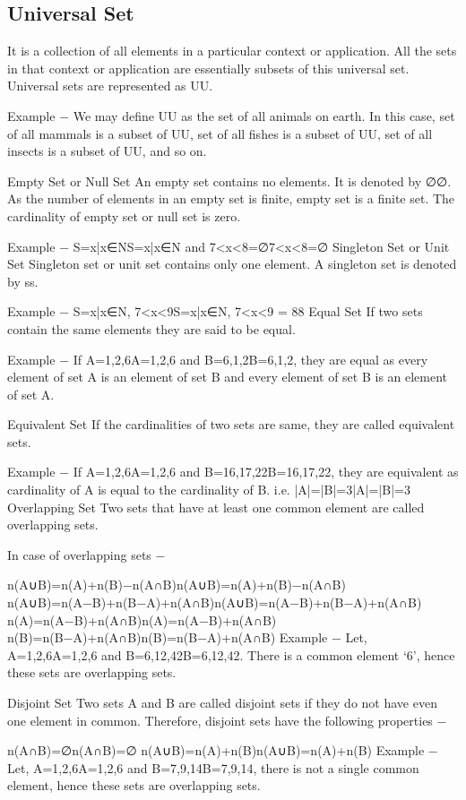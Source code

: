 \documentclass[12pt]{article}
\begin{document}
{\subsection{Universal Set}
It is a collection of all elements in a particular context or application. All the sets in that context or application are essentially subsets of this universal set. Universal sets are represented as UU.

Example − We may define UU as the set of all animals on earth. In this case, set of all mammals is a subset of UU, set of all fishes is a subset of UU, set of all insects is a subset of UU, and so on.

Empty Set or Null Set
An empty set contains no elements. It is denoted by ∅∅. As the number of elements in an empty set is finite, empty set is a finite set. The cardinality of empty set or null set is zero.

Example − S={x|x∈NS={x|x∈N and 7<x<8}=∅7<x<8}=∅
Singleton Set or Unit Set
Singleton set or unit set contains only one element. A singleton set is denoted by {s}{s}.

Example − S={x|x∈N, 7<x<9}S={x|x∈N, 7<x<9} = {8}{8}
Equal Set
If two sets contain the same elements they are said to be equal.

Example − If A={1,2,6}A={1,2,6} and B={6,1,2}B={6,1,2}, they are equal as every element of set A is an element of set B and every element of set B is an element of set A.

Equivalent Set
If the cardinalities of two sets are same, they are called equivalent sets.

Example − If A={1,2,6}A={1,2,6} and B={16,17,22}B={16,17,22}, they are equivalent as cardinality of A is equal to the cardinality of B. i.e. |A|=|B|=3|A|=|B|=3
Overlapping Set
Two sets that have at least one common element are called overlapping sets.

In case of overlapping sets −

n(A∪B)=n(A)+n(B)−n(A∩B)n(A∪B)=n(A)+n(B)−n(A∩B)
n(A∪B)=n(A−B)+n(B−A)+n(A∩B)n(A∪B)=n(A−B)+n(B−A)+n(A∩B)
n(A)=n(A−B)+n(A∩B)n(A)=n(A−B)+n(A∩B)
n(B)=n(B−A)+n(A∩B)n(B)=n(B−A)+n(A∩B)
Example − Let, A={1,2,6}A={1,2,6} and B={6,12,42}B={6,12,42}. There is a common element ‘6’, hence these sets are overlapping sets.

Disjoint Set
Two sets A and B are called disjoint sets if they do not have even one element in common. Therefore, disjoint sets have the following properties −

n(A∩B)=∅n(A∩B)=∅
n(A∪B)=n(A)+n(B)n(A∪B)=n(A)+n(B)
Example − Let, A={1,2,6}A={1,2,6} and B={7,9,14}B={7,9,14}, there is not a single common element, hence these sets are overlapping sets.

}
\end{document}

